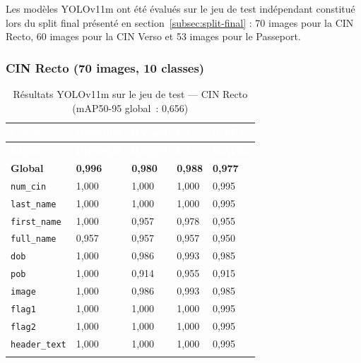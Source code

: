 Les modèles YOLOv11m ont été évalués sur le jeu de test indépendant constitué lors du split final présenté en section~\ref{subsec:split-final} : 70 images pour la CIN Recto, 60 images pour la CIN Verso et 53 images pour le Passeport.

\subsubsection{CIN Recto (70 images, 10 classes)}

\renewcommand{\arraystretch}{1.3}
\setlength{\LTleft}{0pt plus 1fill}
\setlength{\LTright}{0pt plus 1fill}
\begin{longtable}{|p{4cm}|p{2.7cm}|p{2.7cm}|p{2.7cm}|p{2.7cm}|}
  \hline
  \rowcolor{bleu_principal}
  \textcolor{white}{\textbf{Classe}} & \textcolor{white}{\textbf{Précision}} & \textcolor{white}{\textbf{Rappel}} & \textcolor{white}{\textbf{F1}} & \textcolor{white}{\textbf{mAP50}} \\
  \hline
  \endfirsthead
  \hline
  \rowcolor{bleu_principal}
  \textcolor{white}{\textbf{Classe}} & \textcolor{white}{\textbf{Précision}} & \textcolor{white}{\textbf{Rappel}} & \textcolor{white}{\textbf{F1}} & \textcolor{white}{\textbf{mAP50}} \\
  \hline
  \endhead
  \rowcolor{gris_leger}
  \textbf{Global} & \textbf{0,996} & \textbf{0,980} & \textbf{0,988} & \textbf{0,977} \\
  \hline
  \texttt{num\_cin}    & 1,000 & 1,000 & 1,000 & 0,995 \\
  \hline
  \texttt{last\_name}  & 1,000 & 1,000 & 1,000 & 0,995 \\
  \hline
  \texttt{first\_name} & 1,000 & 0,957 & 0,978 & 0,955 \\
  \hline
  \texttt{full\_name}  & 0,957 & 0,957 & 0,957 & 0,950 \\
  \hline
  \texttt{dob}         & 1,000 & 0,986 & 0,993 & 0,985 \\
  \hline
  \texttt{pob}         & 1,000 & 0,914 & 0,955 & 0,915 \\
  \hline
  \texttt{image}       & 1,000 & 0,986 & 0,993 & 0,985 \\
  \hline
  \texttt{flag1}       & 1,000 & 1,000 & 1,000 & 0,995 \\
  \hline
  \texttt{flag2}       & 1,000 & 1,000 & 1,000 & 0,995 \\
  \hline
  \texttt{header\_text}& 1,000 & 1,000 & 1,000 & 0,995 \\
  \hline
  \caption{Résultats YOLOv11m sur le jeu de test --- CIN Recto (mAP50-95 global~: 0,656)}
  \label{tab:yolo-test-recto}
\end{longtable}

